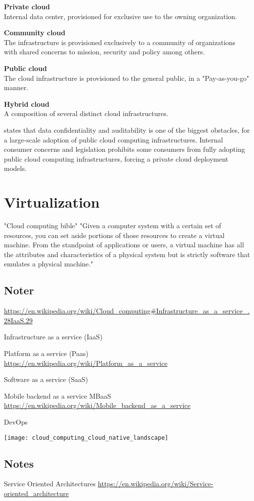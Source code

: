 \textbf{Private cloud}\\
Internal data center, provisioned for exclusive use to the owning organization.


\textbf{Community cloud}\\
The infrastructure is provisioned exclusively to a community of organizations with shared concerns to mission, security and policy among others.


\textbf{Public cloud}\\
The cloud infrastructure is provisioned to the general public, in a "Pay-as-you-go" manner.

\textbf{Hybrid cloud}\\
A composition of several distinct cloud infrastructures.


\citeauthor{armbrust2010view} states that data confidentiality and auditability is one of the biggest obstacles, for a large-scale adoption of public cloud computing infrastructures. Internal consumer concerns and legislation prohibits some consumers from fully adopting public cloud computing infrastructures, forcing a private cloud deployment models. 


\section{Virtualization}
"Cloud computing bible"
"Given a computer system with a certain set of resources, you can set aside portions of those resources to create a virtual machine. From the standpoint of applications or users, a virtual machine has all the attributes and characteristics of a physical system but is strictly software that emulates a physical machine."\cite[p. 100]{sosinsky2010cloud}






\subsection*{Noter}
\url{https://en.wikipedia.org/wiki/Cloud_computing#Infrastructure_as_a_service_.28IaaS.29}

Infrastructure as a service  (IaaS)

Platform as a service (Paas) \url{https://en.wikipedia.org/wiki/Platform_as_a_service}

Software as a service (SaaS)

Mobile backend as a service MBaaS \url{https://en.wikipedia.org/wiki/Mobile_backend_as_a_service}

DevOps

\texttt{[image: cloud\_computing\_cloud\_native\_landscape]}

\subsection*{Notes}
Service Oriented Architectures \url{https://en.wikipedia.org/wiki/Service-oriented_architecture}